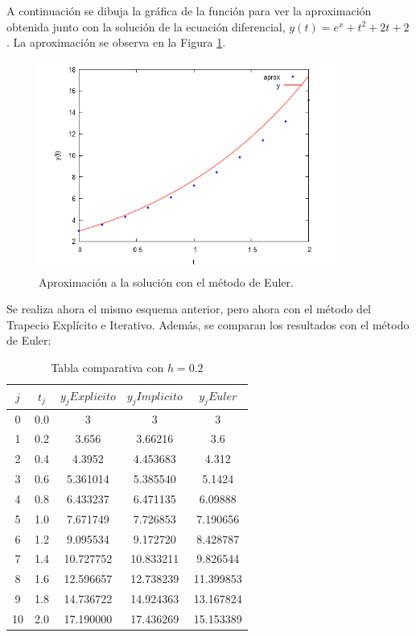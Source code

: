 \documentclass{article}
\theoremstyle{theorem-style}  %
\theoremstyle{definition-style}
\theoremstyle{example-style}
\begin{document}
A continuación se dibuja la gráfica de la función para ver la aproximación obtenida junto con la solución de la ecuación diferencial, $y(t)= e^x + t^2 + 2t + 2$. La aproximación se observa en la Figura \ref{fig:aprox1}.

	\begin{figure}[h]
		\centering
		\includegraphics[width=10cm]{./Images/ejtp1-1.png}
		\caption{Aproximación a la solución con el método de Euler.}
		\label{fig:aprox1}
	\end{figure}

Se realiza ahora el mismo esquema anterior, pero ahora con el método del Trapecio Explícito e Iterativo. Además, se comparan los resultados con el método de Euler:

		\begin{table}[H]
			\centering
			\begin{tabular}{|| c | c | c | c | c||}
				\hline
				\hline $j$ &  $t_j $ & $y_j Explicito$ & $y_j Implicito$ & $y_j Euler$ \\
				\hline 0 & 0.0 & 3 & 3 & 3 \\
				\hline 1 & 0.2 & 3.656 & 3.66216 & 3.6 \\
				\hline 2 & 0.4 & 4.3952 & 4.453683 & 4.312 \\
				\hline 3 & 0.6 & 5.361014 & 5.385540 & 5.1424 \\
				\hline 4 & 0.8 & 6.433237 & 6.471135 & 6.09888 \\
				\hline 5 & 1.0 & 7.671749 & 7.726853 & 7.190656 \\
				\hline 6 & 1.2 & 9.095534 & 9.172720 & 8.428787 \\
				\hline 7 & 1.4 & 10.727752 & 10.833211 & 9.826544 \\
				\hline 8 & 1.6 & 12.596657 & 12.738239 & 11.399853 \\
				\hline 9 & 1.8 & 14.736722 & 14.924363 & 13.167824 \\
				\hline 10 & 2.0 & 17.190000 & 17.436269 & 15.153389 \\
				\hline
				\hline
			\end{tabular}
			\caption{Tabla comparativa con $h=0.2$}
			\label{table:trapecio-ejtp1.2}
	\end{table}
\end{document}
